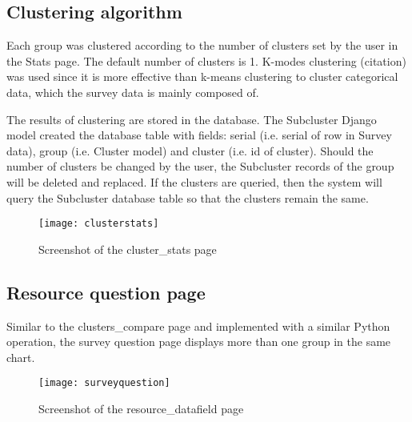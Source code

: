 \subsection{Clustering algorithm}

Each group was clustered according to the number of clusters set by the user in the Stats page. The default number of clusters is 1. K-modes clustering (citation) was used since it is more effective than k-means clustering to cluster categorical data, which the survey data is mainly composed of.\par

The results of clustering are stored in the database. The Subcluster Django model created the database table with fields: serial (i.e. serial of row in Survey data), group (i.e. Cluster model) and cluster (i.e. id of cluster). Should the number of clusters be changed by the user, the Subcluster records of the group will be deleted and replaced. If the clusters are queried, then the system will query the Subcluster database table so that the clusters remain the same.

\begin{figure}[h]
\centering
\texttt{[image: clusterstats]}
\caption{Screenshot of the cluster\_stats page}
\label{fig:clustestats}
\end{figure}


\subsection{Resource question page}
Similar to the clusters\_compare page and implemented with a similar Python operation, the survey question page displays more than one group in the same chart. 

\begin{figure}[h]
\centering
\texttt{[image: surveyquestion]}
\caption{Screenshot of the resource\_datafield page}
\label{fig:surveyquestion}
\end{figure}
